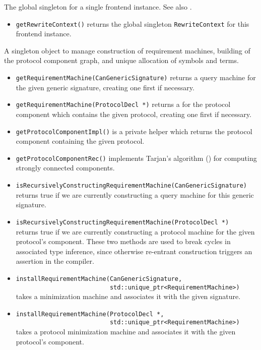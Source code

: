 \documentclass[../generics]{subfiles}
\begin{document}
The global singleton for a single frontend instance. See also .
\begin{itemize}
\item \texttt{getRewriteContext()} returns the global singleton \texttt{RewriteContext} for this frontend instance.
\end{itemize}

A singleton object to manage construction of requirement machines, building of the protocol component graph, and unique allocation of symbols and terms.
\begin{itemize}
\item \texttt{getRequirementMachine(CanGenericSignature)} returns a query machine for the given generic signature, creating one first if necessary.
\item \texttt{getRequirementMachine(ProtocolDecl *)} returns a  for the protocol component which contains the given protocol, creating one first if necessary.
\item \texttt{getProtocolComponentImpl()} is a private helper which returns the protocol component containing the given protocol.
\item \texttt{getProtocolComponentRec()} implements Tarjan's algorithm () for computing strongly connected components.
\item \texttt{isRecursivelyConstructingRequirementMachine(CanGenericSignature)}\\
returns true if we are currently constructing a query machine for this generic signature.
\item \texttt{isRecursivelyConstructingRequirementMachine(ProtocolDecl *)}\\
returns true if we are currently constructing a protocol machine for the given protocol's component. These two methods are used to break cycles in associated type inference, since otherwise re-entrant construction triggers an assertion in the compiler.
\item
\verb|installRequirementMachine(CanGenericSignature,|\\
\verb|                          std::unique_ptr<RequirementMachine>)|\\
takes a minimization machine and associates it with the given signature.
\item
\verb|installRequirementMachine(ProtocolDecl *,|\\
\verb|                          std::unique_ptr<RequirementMachine>)|\\
takes a protocol minimization machine and associates it with the given protocol's component.
\end{itemize}
\end{document}
